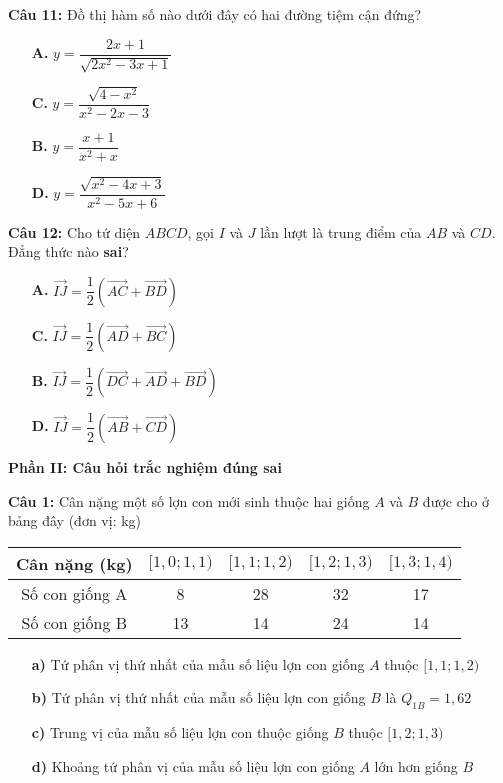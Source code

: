 \documentclass[12pt, a4paper]{article}
\begin{document}
\textbf{Câu 11: } Đồ thị hàm số nào dưới đây có hai đường tiệm cận đứng?
	\begin{multicols}{2}
		\begin{enumerate}
			\item[\textbf{A.}] $ y = \dfrac{2x + 1}{\sqrt{2x^2 -3x + 1}} $
			\item[\textbf{C.}] $ y = \dfrac{\sqrt{4 - x^2}}{x^2 - 2x - 3} $
			\item[\textbf{B.}] $ y = \dfrac{x + 1}{x^2 + x} $
			\item[\textbf{D.}] $ y = \dfrac{\sqrt{x^2 -4x + 3}}{x^2 -5x + 6} $
		\end{enumerate}
	\end{multicols}

\textbf{Câu 12: } Cho tứ diện $ ABCD $, gọi $ I $ và $ J $ lần lượt là trung điểm của $ AB $ và $ CD $. Đẳng thức nào \textbf{sai}?
	\begin{multicols}{2}
		\begin{enumerate}
			\item[\textbf{A.}] $ \overrightarrow{IJ} = \dfrac{1}{2} ( \overrightarrow{AC} + \overrightarrow{BD}) $
			\item[\textbf{C.}] $ \overrightarrow{IJ} = \dfrac{1}{2} ( \overrightarrow{AD} + \overrightarrow{BC}) $
			\item[\textbf{B.}] $ \overrightarrow{IJ} = \dfrac{1}{2} ( \overrightarrow{DC} + \overrightarrow{AD} + \overrightarrow{BD}) $
			\item[\textbf{D.}] $ \overrightarrow{IJ} = \dfrac{1}{2} ( \overrightarrow{AB} + \overrightarrow{CD}) $
		\end{enumerate}
	\end{multicols}

\textbf{Phần II: Câu hỏi trắc nghiệm đúng sai}

\textbf{Câu 1: } Cân nặng một số lợn con mới sinh thuộc hai giống $ A $ và $ B $ được cho ở bảng đây (đơn vị: kg)
	\begin{table}[h!]
	\centering
	\renewcommand{\arraystretch}{1.5}
		\begin{tabular}{|c||c|c|c|c|}
			\hline
			Cân nặng (kg) & $ [1,0; 1,1) $ & $ [1,1; 1,2) $ & $ [1,2; 1,3 ) $ & $ [1,3; 1,4) $ \\ \hline
			Số con giống A  & 8   & 28  & 32  & 17      \\ \hline 
			Số con giống B  & 13  & 14  & 24  & 14      \\ \hline
		\end{tabular}
	\end{table}
\vspace{-0.5cm}
	\begin{enumerate}
		\item[\textbf{a)}] Tứ phân vị thứ nhất của mẫu số liệu lợn con giống $ A $ thuộc $ [1,1; 1,2) $
		\item[\textbf{b)}] Tứ phân vị thứ nhất của mẫu số liệu lợn con giống $ B $ là $ Q_{1B} = 1,62 $
		\item[\textbf{c)}] Trung vị của mẫu số liệu lợn con thuộc giống $ B $ thuộc $ [1,2; 1,3) $
		\item[\textbf{d)}] Khoảng tứ phân vị của mẫu số liệu lợn con giống $ A $ lớn hơn giống $ B $
	\end{enumerate}	
	
\end{document}
